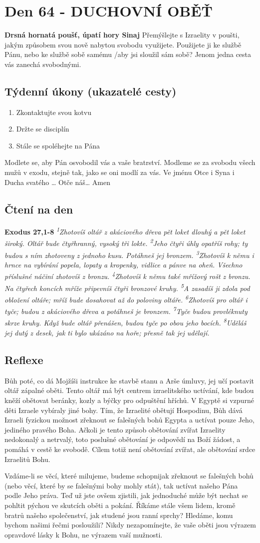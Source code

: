 \documentclass[11pt]{article}
\newcommand{\zacatekDesatyTyden}{
\textbf{Drsná hornatá poušť, úpatí hory Sinaj} \newline 
Přemýšlejte s Izraelity v poušti, jakým způsobem svou nově nabytou svobodu využijete. Použijete ji ke službě Pánu, nebo ke službě sobě samému /aby jsi sloužil sám sobě? Jenom jedna cesta vás zanechá svobodnými.

\subsection*{Týdenní úkony (ukazatelé cesty)}
\begin{enumerate}
  \item Zkontaktujte svou kotvu
  \item Držte se disciplín
  \item Stále se spoléhejte na Pána
\end{enumerate}
Modlete se, aby Pán osvobodil vás a vaše bratrství. \newline
Modleme se za svobodu všech mužů v exodu, stejně tak, jako se oni modlí za vás.\newline
Ve jménu Otce i Syna i Ducha svatého …  Otče náš… Amen
}
\begin{document}
\newpage
\section{Den 64 - DUCHOVNÍ OBĚŤ}
\zacatekDesatyTyden
\subsection*{Čtení na den}
\textbf{Exodus 27,1-8}
\newline
\textit{
\textsuperscript{1}Zhotovíš oltář z akáciového dřeva pět loket dlouhý a pět loket široký. Oltář bude čtyřhranný, vysoký tři lokte.
\textsuperscript{2}Jeho čtyři úhly opatříš rohy; ty budou s ním zhotoveny z jednoho kusu. Potáhneš jej bronzem.
\textsuperscript{3}Zhotovíš k němu i hrnce na vybírání popela, lopaty a kropenky, vidlice a pánve na oheň. Všechno příslušné náčiní zhotovíš z bronzu.
\textsuperscript{4}Zhotovíš k němu také mřížový rošt z bronzu. Na čtyřech koncích mříže připevníš čtyři bronzové kruhy.
\textsuperscript{5}A zasadíš ji zdola pod obložení oltáře; mříž bude dosahovat až do poloviny oltáře.
\textsuperscript{6}Zhotovíš pro oltář i tyče; budou z akáciového dřeva a potáhneš je bronzem.
\textsuperscript{7}Tyče budou provléknuty skrze kruhy. Když bude oltář přenášen, budou tyče po obou jeho bocích.
\textsuperscript{8}Uděláš jej dutý z desek, jak ti bylo ukázáno na hoře; přesně tak jej udělají.
}

\subsection*{Reflexe}
Bůh poté, co dá Mojžíši instrukce ke stavbě stanu a Arše úmluvy, jej učí postavit oltář zápalné oběti. Tento
oltář má být centrem izraelitského uctívání, kde budou kněží obětovat beránky, kozly a býčky pro odpuštění
hříchů. V Egyptě si vzpurné děti Izraele vybíraly jiné bohy. Tím, že Izraelité obětují Hospodinu, Bůh dává
Izraeli fyzickou možnost zřeknout se falešných bohů Egypta a uctívat pouze Jeho, jediného pravého Boha.
Ačkoli je tento způsob obětování zvířat Izraelity nedokonalý a netrvalý, toto poslušné obětování je odpovědí
na Boží žádost, a pomáhá v cestě ke svobodě. Cílem totiž není obětování zvířat, ale obětování srdce Izraelitů
Bohu.

Vzdáme-li se věcí, které milujeme, budeme schopnijak zřeknout se falešných bohů (nebo věcí, které by se
falešnými bohy mohly stát), tak uctívat našeho Pána podle Jeho práva. Teď už jste ovšem zjistili, jak
jednoduché může být nechat se pohltit pýchou ve skutcích oběti a pokání. Říkáme stále všem lidem, kromě
bratrů našeho společenství, jak studené jsou ranní sprchy? Hledáme, komu bychom našimi řečmi posloužili?
Nikdy nezapomínejte, že vaše oběti jsou výrazem opravdové lásky k Bohu, ne výrazem vaší mužnosti.
\end{document}
